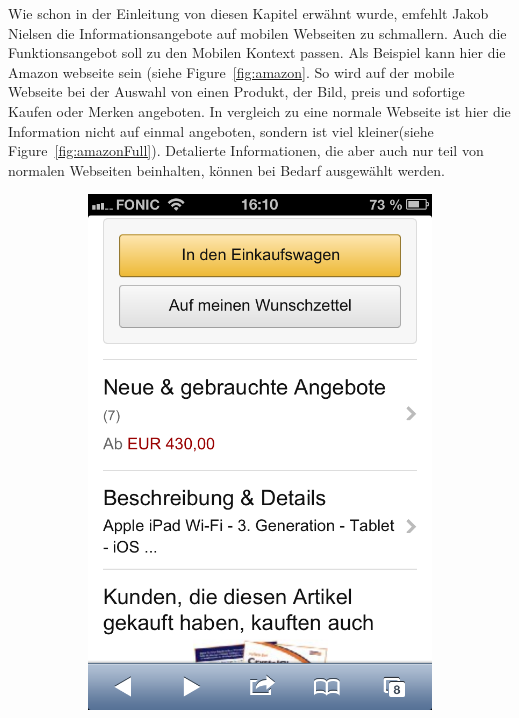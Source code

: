 Wie schon in der Einleitung von diesen Kapitel erwähnt wurde, emfehlt Jakob Nielsen die Informationsangebote auf mobilen Webseiten zu schmallern. Auch die Funktionsangebot soll zu den Mobilen Kontext passen. Als Beispiel kann hier die Amazon webseite sein (siehe Figure~\ref{fig:amazon}. So wird auf der mobile Webseite bei der Auswahl von einen Produkt, der Bild, preis und sofortige Kaufen oder Merken angeboten. In vergleich zu eine normale Webseite ist hier die Information nicht auf einmal angeboten, sondern ist viel kleiner(siehe Figure~\ref{fig:amazonFull}). Detalierte Informationen, die aber auch nur teil von normalen Webseiten beinhalten, können bei Bedarf ausgewählt werden. 

\begin{figure}
	\centering
	\begin{subfigure}[b]{0.3\textwidth}
		\centering
		\includegraphics[width=1\textwidth]{img/amazon.png}

\end{subfigure}
\end{figure}
